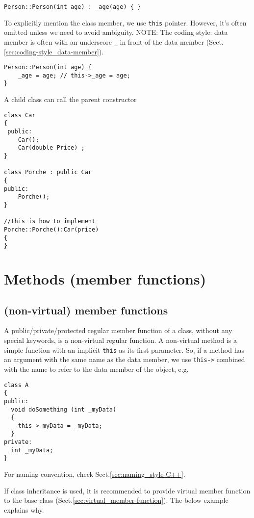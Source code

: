 {\small \begin{verbatim} 
Person::Person(int age) : _age(age) { }
\end{verbatim}}

To explicitly mention the class member, we use \verb!this! pointer.
However, it's often omitted unless we need to avoid ambiguity. NOTE:
The coding style: data member is often with an underscore \verb!_! in front of
the data member (Sect.\ref{sec:coding-style_data-member}).

{\small \begin{verbatim} 
Person::Person(int age) {
    _age = age; // this->_age = age;
}
\end{verbatim}}


A child class can call the parent constructor 

\begin{verbatim}
class Car 
{  
 public:
    Car();
    Car(double Price) ;
}

class Porche : public Car
{
public:
    Porche();
}

//this is how to implement
Porche::Porche():Car(price)
{
}
\end{verbatim}


\section{Methods (member functions)}
\label{sec:member-function-C++-class}

\subsection{(non-virtual) member functions}
\label{sec:non-virtual-member-function}

A public/private/protected regular member function of a class, without any
special keywords, is a non-virtual regular function.
A non-virtual method is a simple function with an implicit \verb!this! as its
first parameter. So, if a method has an argument with the same name as the data
member, we use \verb!this->! combined with the name to refer to the data
member of the object, e.g.
\begin{verbatim}
class A
{
public:
  void doSomething (int _myData)
  {
    this->_myData = _myData;
  }
private:
  int _myData;
}
\end{verbatim}
For naming convention, check Sect.\ref{sec:naming_style-C++}.

If class inheritance is used, it is recommended to provide virtual member
function to the base class (Sect.\ref{sec:virtual_member-function}). The below
example explains why.

